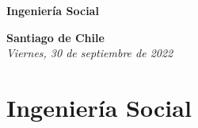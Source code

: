 \documentclass[12pt]{article}
\begin{document}
\begin{center}
    \vspace*{8cm}
    {\Huge \textbf{\sffamily Ingeniería Social}}\\[0.5em]
\end{center}

\begin{center}
    \vspace{9cm}
    \textcolor{secondary}{\textbf{Santiago de Chile}}\\
    \textit{Viernes, 30 de septiembre de 2022}
    \vspace{1cm}
\end{center}


\newpage



\tableofcontents
\newpage

\section{Ingeniería Social}
\end{document}
